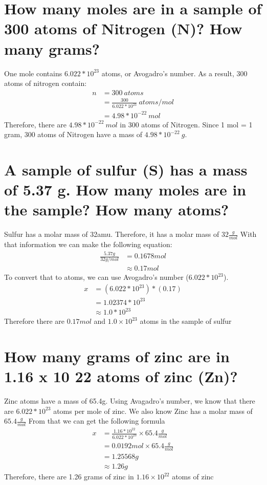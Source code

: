 \documentclass[11pt]{article}
\begin{document}
\section{How many moles are in a sample of 300 atoms of Nitrogen (N)? How many grams?}
\label{sec:orgf4227b8}
One mole contains \(6.022 *10^{23}\) atoms, or Avogadro's number. As a result, 300 atoms of nitrogen contain:
\begin{align*}
n&=300\ atoms\\
&=\frac{300}{6.022*10^{23}}\ atoms/mol\\
&=4.98*10^{-22}\ mol
\end{align*}
Therefore, there are \(4.98*10^{-22}\ mol\) in 300 atoms of Nitrogen. Since 1 mol = 1 gram, 300 atoms of Nitrogen have a mass of \(4.98*10^{-22}\ g\).

\section{A sample of sulfur (S) has a mass of 5.37 g. How many moles are in the sample? How many atoms?}
\label{sec:org14563d0}
Sulfur has a molar mass of 32amu. Therefore, it has a molar mass of
\(32\frac{g}{mol}\)
With that information we can make the following equation:
\begin{align*}
\frac{5.37g}{32g/mol}&=0.1678mol\\
&\approx0.17mol
\end{align*}
To convert that to atoms, we can use Avogadro's number (\(6.022 *10^{23}\)).
\begin{align*}
x&=(6.022*10^{23})*(0.17)\\
&=1.02374*10^{23}\\
&\approx1.0*10^{23}
\end{align*}
Therefore there are \(0.17mol\) and \(1.0\times10^{23}\) atoms in the sample of sulfur

\section{How many grams of zinc are in 1.16 x 10 22 atoms of zinc (Zn)?}
\label{sec:org3cda0f2}
Zinc atoms have a mass of 65.4g. Using Avagadro's number, we know that there are \(6.022 *10^{23}\) atoms per mole of zinc.
We also know Zinc has a molar mass of \(65.4\frac{g}{mol}\)
From that we can get the following formula
\begin{align*}
x&=\frac{1.16*10^{22}}{6.022*10^{23}}\times65.4 \frac{g}{mol}\\
&=0.0192mol\times65.4\frac{g}{mol}\\
&=1.25568g\\
&\approx1.26g
\end{align*}
Therefore, there are 1.26 grams of zinc in \(1.16\times10^{22}\) atoms  of zinc
\end{document}
